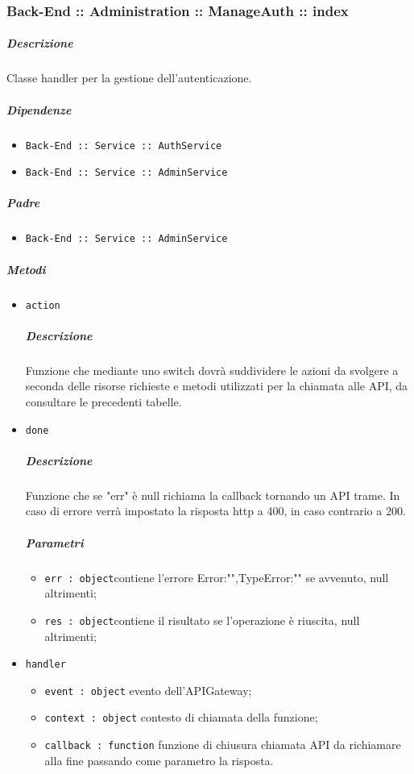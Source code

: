 \documentclass[../ManualeSviluppatore_v1.0.0.tex]{subfiles}
\begin{document}
\subsubsection{Back-End :: Administration :: ManageAuth :: index}
\subparagraph{Descrizione} Classe handler per la gestione dell'autenticazione.
\subparagraph{Dipendenze}
\begin{itemize}
	\item \texttt{Back-End :: Service :: AuthService}
	\item	\texttt{Back-End :: Service :: AdminService}
\end{itemize}
\subparagraph{Padre}
\begin{itemize}
	\item	\texttt{Back-End :: Service :: AdminService}
\end{itemize}
\subparagraph{Metodi}
\begin{itemize}
	\item \texttt{action}
	      \subparagraph{Descrizione} Funzione che mediante uno switch dovrà suddividere le azioni da svolgere a seconda delle risorse richieste e metodi utilizzati per la chiamata alle API, da consultare le precedenti tabelle.
	\item \texttt{done}
	      \subparagraph{Descrizione} Funzione che se "err" è null richiama la callback tornando un API trame. In caso di errore verrà impostato la risposta http a 400, in caso contrario a 200.
	      \subparagraph{Parametri}
	      \begin{itemize}
	      	\item \texttt{err : object}contiene l'errore {Error:"",TypeError:""} se avvenuto, null altrimenti;
	      	\item \texttt{res : object}contiene il risultato se l'operazione è riuscita, null altrimenti;
	      \end{itemize}
	\item \texttt{handler}
	      \begin{itemize}
	      	\item \texttt{event : object} evento dell'APIGateway;
	      	\item \texttt{context : object} contesto di chiamata della funzione;
	      	\item \texttt{callback : function} funzione di chiusura chiamata API da richiamare alla fine passando come parametro la risposta.
	      \end{itemize}
\end{itemize}
\end{document}
